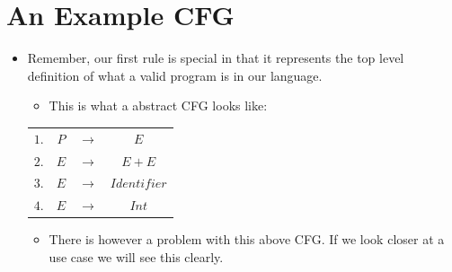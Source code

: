 \documentclass{article}
\begin{document}
\section{An Example CFG}
\begin{itemize}
    \item Remember, our first rule is special in that it represents the top level definition of what a valid program is in our language.
    \begin{itemize}
        \item This is what a abstract CFG looks like:
    \end{itemize}
    \begin{center}
        \begin{tabular}{ |c c c c| }
            \hline
            $1.$ & $P$ & ${\rightarrow}$ & $E$ \\
            $2.$ & $E$ & ${\rightarrow}$ & $E+E$ \\
            $3.$ & $E$ & ${\rightarrow}$ & $Identifier$ \\
            $4.$ & $E$ & ${\rightarrow}$ & $Int$ \\
            \hline
        \end{tabular}
    \end{center}
    \begin{itemize}
        \item There is however a problem with this above CFG. If we look closer at a use case we will see this clearly.
    \end{itemize}
\end{itemize}
\end{document}
